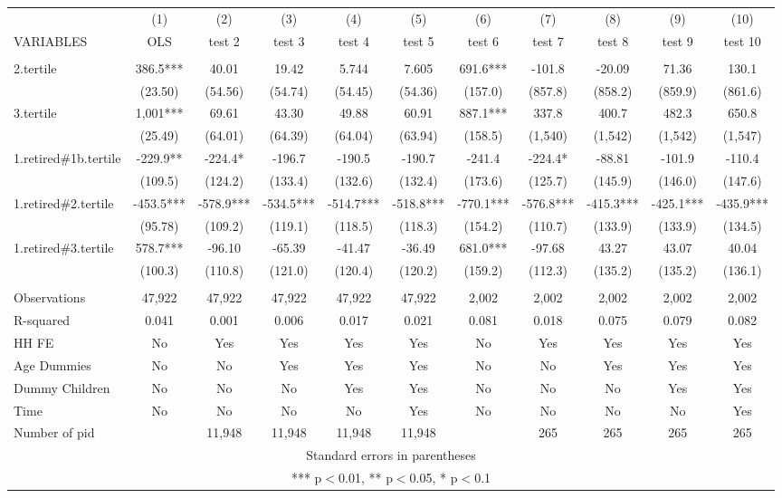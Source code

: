 \begin{tabular}{lcccccccccc} \hline
 & (1) & (2) & (3) & (4) & (5) & (6) & (7) & (8) & (9) & (10) \\
VARIABLES & OLS & test 2 & test 3 & test 4 & test 5 & test 6 & test 7 & test 8 & test 9 & test 10 \\ \hline
 &  &  &  &  &  &  &  &  &  &  \\
2.tertile & 386.5*** & 40.01 & 19.42 & 5.744 & 7.605 & 691.6*** & -101.8 & -20.09 & 71.36 & 130.1 \\
 & (23.50) & (54.56) & (54.74) & (54.45) & (54.36) & (157.0) & (857.8) & (858.2) & (859.9) & (861.6) \\
3.tertile & 1,001*** & 69.61 & 43.30 & 49.88 & 60.91 & 887.1*** & 337.8 & 400.7 & 482.3 & 650.8 \\
 & (25.49) & (64.01) & (64.39) & (64.04) & (63.94) & (158.5) & (1,540) & (1,542) & (1,542) & (1,547) \\
1.retired\#1b.tertile & -229.9** & -224.4* & -196.7 & -190.5 & -190.7 & -241.4 & -224.4* & -88.81 & -101.9 & -110.4 \\
 & (109.5) & (124.2) & (133.4) & (132.6) & (132.4) & (173.6) & (125.7) & (145.9) & (146.0) & (147.6) \\
1.retired\#2.tertile & -453.5*** & -578.9*** & -534.5*** & -514.7*** & -518.8*** & -770.1*** & -576.8*** & -415.3*** & -425.1*** & -435.9*** \\
 & (95.78) & (109.2) & (119.1) & (118.5) & (118.3) & (154.2) & (110.7) & (133.9) & (133.9) & (134.5) \\
1.retired\#3.tertile & 578.7*** & -96.10 & -65.39 & -41.47 & -36.49 & 681.0*** & -97.68 & 43.27 & 43.07 & 40.04 \\
 & (100.3) & (110.8) & (121.0) & (120.4) & (120.2) & (159.2) & (112.3) & (135.2) & (135.2) & (136.1) \\
 &  &  &  &  &  &  &  &  &  &  \\
Observations & 47,922 & 47,922 & 47,922 & 47,922 & 47,922 & 2,002 & 2,002 & 2,002 & 2,002 & 2,002 \\
R-squared & 0.041 & 0.001 & 0.006 & 0.017 & 0.021 & 0.081 & 0.018 & 0.075 & 0.079 & 0.082 \\
HH FE & No & Yes & Yes & Yes & Yes & No & Yes & Yes & Yes & Yes \\
Age Dummies & No & No & Yes & Yes & Yes & No & No & Yes & Yes & Yes \\
Dummy Children & No & No & No & Yes & Yes & No & No & No & Yes & Yes \\
Time & No & No & No & No & Yes & No & No & No & No & Yes \\
 Number of pid &  & 11,948 & 11,948 & 11,948 & 11,948 &  & 265 & 265 & 265 & 265 \\ \hline
\multicolumn{11}{c}{ Standard errors in parentheses} \\
\multicolumn{11}{c}{ *** p$<$0.01, ** p$<$0.05, * p$<$0.1} \\
\end{tabular}
